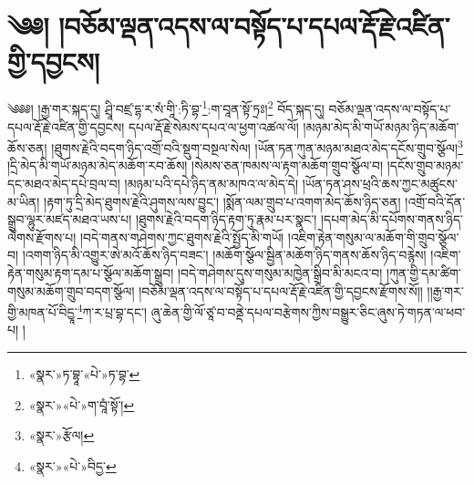 \chapter{༄༅། །བཅོམ་ལྡན་འདས་ལ་བསྟོད་པ་དཔལ་རྡོ་རྗེ་འཛིན་གྱི་དབྱངས།}༄༅༅། །རྒྱ་གར་སྐད་དུ། ཤྲཱི་བཛྲ་དྷ་ར་སཾ་གཱི་:ཏི་བྷ་\footnote{«སྣར་»ཏ་བྷཱ་«པེ་»ཏ་བྷ་}:ག་བཱན་སྟོ་ཏྲཿ།\footnote{«སྣར་»«པེ་»ག་བཱཾ་སྟོ་།} བོད་སྐད་དུ། བཅོམ་ལྡན་འདས་ལ་བསྟོད་པ་དཔལ་རྡོ་རྗེ་འཛིན་གྱི་དབྱངས། དཔལ་རྡོ་རྗེ་སེམས་དཔའ་ལ་ཕྱག་འཚལ་ལོ། །མཉམ་མེད་མི་གཡོ་མཉམ་ཉིད་མཆོག་ཆོས་ཅན། །ཐུགས་རྗེའི་བདག་ཉིད་འགྲོ་བའི་སྡུག་བསྔལ་སེལ། །ཡོན་ཏན་ཀུན་མཉམ་མཐའ་མེད་དངོས་གྲུབ་སྩོལ།\footnote{«སྣར་»རྩོལ།} །དྲི་མེད་མི་གཡོ་མཉམ་མེད་མཆོག་རབ་ཆོས། །སེམས་ཅན་ཁམས་ལ་རྟག་མཆོག་གྲུབ་སྩོལ་བ། །དངོས་གྲུབ་མཉམ་དང་མཐའ་མེད་དཔེ་བྲལ་བ། །མཉམ་པའི་དཔེ་ཉིད་ནམ་མཁའ་ལ་མེད་དེ། །ཡོན་ཏན་ཤས་ཕྲའི་ཆས་ཀྱང་མཚུངས་མ་ཡིན། །རྟག་ཏུ་དྲི་མེད་ཐུགས་རྗེའི་ཤུགས་ལས་བྱུང་། །སྨོན་ལམ་གྲུབ་པ་འགག་མེད་ཆོས་ཉིད་ཅན། །འགྲོ་བའི་དོན་སྒྲུབ་ལྷུར་མཛད་མཐའ་ཡས་པ། །ཐུགས་རྗེའི་བདག་ཉིད་རྟག་ཏུ་རྣམ་པར་སྣང་། །དཔག་མེད་མི་དཔོགས་གནས་ཉིད་ལེགས་རྫོགས་པ། །བདེ་གནས་གཤེགས་ཀྱང་ཐུགས་རྗེའི་སྤྱོད་མི་གཡོ། །འཇིག་རྟེན་གསུམ་ལ་མཆོག་གི་གྲུབ་སྩོལ་བ། །འགག་ཉིད་མི་འགྱུར་ཨེ་མའོ་ཆོས་ཉིད་བཟང་། །མཆོག་སྩོལ་སྦྱིན་མཆོག་ཉིད་གནས་ཆོས་ཉིད་བརྙེས། །འཇིག་རྟེན་གསུམ་རྟག་དམ་པ་སྩོལ་མཆོག་སྒྲུབ། །བདེ་གཤེགས་དུས་གསུམ་མཁྱེན་སྒྲིབ་མི་མངའ་བ། །ཀུན་གྱི་དམ་ཚིག་གསུམ་མཆོག་གྲུབ་བདག་སྩོལ། །བཅོམ་ལྡན་འདས་ལ་བསྟོད་པ་དཔལ་རྡོ་རྗེ་འཛིན་གྱི་དབྱངས་རྫོགས་སོ།། །།རྒྱ་གར་གྱི་མཁན་པོ་བིདྱཱ་\footnote{«སྣར་»«པེ་»བིདྱ་}ཀ་ར་པྲ་བྷ་དང་། ཞུ་ཆེན་གྱི་ལོ་ཙཱ་བ་བནྡེ་དཔལ་བརྩེགས་ཀྱིས་བསྒྱུར་ཅིང་ཞུས་ཏེ་གཏན་ལ་ཕབ་པ། ། 